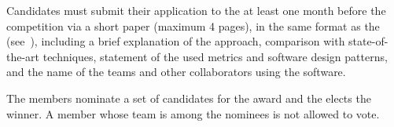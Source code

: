 Candidates must submit their application to the \TC{} at least one month before the competition via a short paper (maximum 4 pages), in the same format as the \TDP{} (see~), including a brief explanation of the approach, comparison with state-of-the-art techniques, statement of the used metrics and software design patterns, and the name of the teams and other collaborators using the software.

The \AtHome{} \EC{} members nominate a set of candidates for the award and the \TC{} elects the winner.
A \TC{} member whose team is among the nominees is not allowed to vote.


